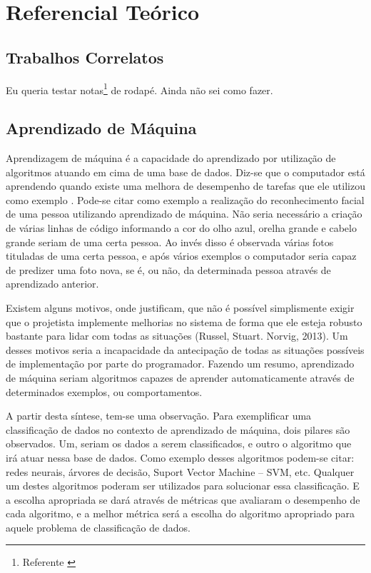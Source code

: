 \chapter{Referencial Teórico}\label{cap:refTeor}

\lipsum[34]

\section{Trabalhos Correlatos}\label{sec:primTrab}

Eu queria testar notas\footnote{Referente \cite{1}  } de rodapé\cite[Seilá]{3}. Ainda não sei como fazer.


\lipsum[34]
\section{Aprendizado de Máquina}\label{sec:aprendMaq}

Aprendizagem de máquina é a capacidade do aprendizado por utilização de algoritmos atuando em cima de uma base de dados.  Diz-se que o computador está aprendendo quando existe uma melhora de desempenho de tarefas que ele utilizou como exemplo \cite{Mitchell1997}. Pode-se citar como exemplo a realização do reconhecimento facial de uma pessoa utilizando aprendizado de máquina. Não seria necessário a criação de várias linhas de código informando a cor do olho azul, orelha grande e cabelo grande seriam de uma certa pessoa. Ao invés disso é observada várias fotos tituladas de uma certa pessoa, e após vários exemplos o computador seria capaz de predizer uma foto nova, se é, ou não, da determinada pessoa através de aprendizado anterior.

Existem alguns motivos, onde justificam, que não é possível simplismente exigir que o projetista implemente melhorias no sistema de forma que ele esteja robusto bastante para lidar com todas as situações (Russel, Stuart. Norvig, 2013). Um  desses motivos seria a incapacidade da antecipação de  todas as situações possíveis de implementação por parte do programador. Fazendo um resumo, aprendizado de máquina seriam algoritmos capazes de aprender automaticamente através de  determinados exemplos, ou comportamentos. 

A partir desta síntese, tem-se uma observação. Para exemplificar uma classificação de dados no contexto de aprendizado de máquina, dois pilares são observados. Um, seriam os dados a serem classificados, e outro o algoritmo que irá atuar nessa base de dados. Como exemplo desses algoritmos podem-se citar: redes neurais, árvores de decisão, Suport Vector Machine – SVM, etc. Qualquer um destes algoritmos poderam ser utilizados para solucionar essa classificação. E a escolha apropriada se dará através de métricas que avaliaram o desempenho de cada algoritmo, e a melhor métrica será a escolha do algoritmo apropriado para aquele problema de classificação de dados. 

